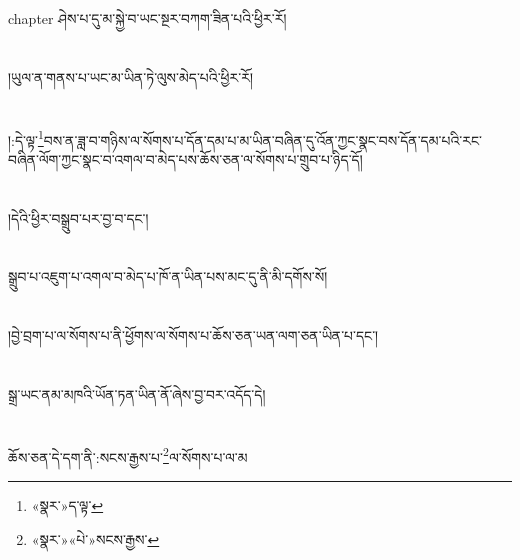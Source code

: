 chapter{ }ཤེས་པ་དུ་མ་སྐྱེ་བ་ཡང་སྔར་བཀག་ཟིན་པའི་ཕྱིར་རོ།\chapter{ }།ཡུལ་ན་གནས་པ་ཡང་མ་ཡིན་ཏེ་ལུས་མེད་པའི་ཕྱིར་རོ།\chapter{ }།:དེ་ལྟ་\footnote{«སྣར་»ད་ལྟ་}བས་ན་ཟླ་བ་གཉིས་ལ་སོགས་པ་དོན་དམ་པ་མ་ཡིན་བཞིན་དུ་འོན་ཀྱང་སྣང་བས་དོན་དམ་པའི་རང་བཞིན་ལོག་ཀྱང་སྣང་བ་འགལ་བ་མེད་པས་ཆོས་ཅན་ལ་སོགས་པ་གྲུབ་པ་ཉིད་དོ།\chapter{ }།དེའི་ཕྱིར་བསྒྲུབ་པར་བྱ་བ་དང་།\chapter{ }སྒྲུབ་པ་འཇུག་པ་འགལ་བ་མེད་པ་ཁོ་ན་ཡིན་པས་མང་དུ་ནི་མི་དགོས་སོ།\chapter{ }།བྱེ་བྲག་པ་ལ་སོགས་པ་ནི་ཕྱོགས་ལ་སོགས་པ་ཆོས་ཅན་ཡན་ལག་ཅན་ཡིན་པ་དང་།\chapter{ }སྒྲ་ཡང་ནམ་མཁའི་ཡོན་ཏན་ཡིན་ནོ་ཞེས་བྱ་བར་འདོད་དེ།\chapter{ }ཆོས་ཅན་དེ་དག་ནི་:སངས་རྒྱས་པ་\footnote{«སྣར་»«པེ་»སངས་རྒྱས་}ལ་སོགས་པ་ལ་མ